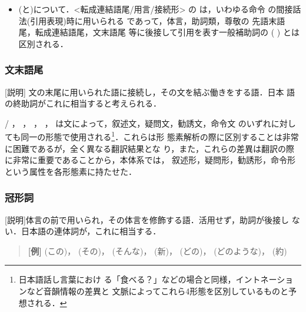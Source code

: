 \begin{itemize}
\item 
{}
(と)について．<転成連結語尾/用言/接続形> の 
 は，いわゆる命令
の間接話法(引用表現)時に用いられる 
であって，体言，助詞類，尊敬の
先語末語尾，転成連結語尾，文末語尾 等に後接して引用を表す一般補助詞の 
(
)
 とは区別される．
\end{itemize}

\subsubsection{文末語尾}        
[説明] 文の末尾に用いられた語に接続し，その文を結ぶ働きをする語．日本
語の終助詞がこれに相当すると考えられる．

/
，
，
，
，
 は文によって，叙述文，疑問文，勧誘文，命令文
のいずれに対しても同一の形態で使用される\footnote{日本語話し言葉におけ
  る「食べる？」などの場合と同様，イントネーションなど音韻情報の差異と
  文脈によってこれら4形態を区別しているものと予想される．}．これらは形
態素解析の際に区別することは非常に困難であるが，全く異なる翻訳結果とな
り，また，これらの差異は翻訳の際に非常に重要であることから，本体系では，
叙述形，疑問形，勧誘形，命令形という属性を各形態素に持たせた．


\subsubsection{冠形詞}        
[説明]体言の前で用いられ，その体言を修飾する語．活用せず，助詞が後接し
ない．日本語の連体詞が，これに相当する．

\begin{quote}
{\bf [例]}
(この)，
(その)，
(そんな)，
(新)，
(どの)，
(どのような)，
(約)
\end{quote}


